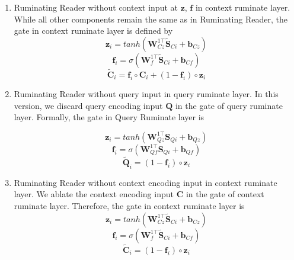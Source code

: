 \documentclass[11pt,letterpaper]{article}
\begin{document}
\begin{enumerate}
\item Ruminating Reader without context input at  $\bm{z}$, $\bm{f}$ in context ruminate layer. While all other components  remain the same as in Ruminating Reader, the gate in context ruminate layer is defined by
\begin{equation}
\bm{z}_i = tanh(\bm{W}^{1\top}_{Cz} \tilde{\bm{S}}_{Ci}+ \bm{b}_{Cz})
\end{equation}
\begin{equation}
\bm{f}_i = \sigma(\bm{W}^{1\top}_{f}\tilde{\bm{S}}_{Ci} + \bm{b}_{Cf} )
\end{equation}
\begin{equation}
\tilde{\bm{C}}_i = \bm{f}_i \circ \bm{C}_i + (1-\bm{f}_i) \circ \bm{z}_i
\end{equation}

\item Ruminating Reader without query input in query ruminate layer. In this version, we discard query encoding input $\bm{Q}$ in the gate of query ruminate layer. Formally, the gate in Query Ruminate layer is 

\begin{equation}
\bm{z}_i = tanh(\bm{W}^{1\top}_{Qz} \bm{S}_{Qi} + \bm{b}_{Qz})
\end{equation}
\begin{equation}
\bm{f}_i = \sigma(\bm{W}^{1\top}_{Qf} \bm{S}_{Qi} + \bm{b}_{Qf})
\end{equation}
\begin{equation}
\tilde{\bm{Q}}_i = (1-\bm{f}_i)\circ \bm{z}_i
\end{equation}

\item Ruminating Reader without context encoding input in context ruminate layer. We ablate the context encoding input $\bm{C}$ in the gate of context ruminate layer. Therefore, the gate in context ruminate layer is
\begin{equation}
\bm{z}_i = tanh(\bm{W}^{1\top}_{Cz} \tilde{\bm{S}}_{Ci} + \bm{b}_{Cz})
\end{equation}
\begin{equation}
\bm{f}_i = \sigma(\bm{W}^{1\top}_{f}\tilde{\bm{S}}_{Ci} + \bm{b}_{Cf} )
\end{equation}
\begin{equation}
\tilde{\bm{C}}_i = (1-\bm{f}_i) \circ \bm{z}_i
\end{equation}


\end{enumerate}
\end{document}
